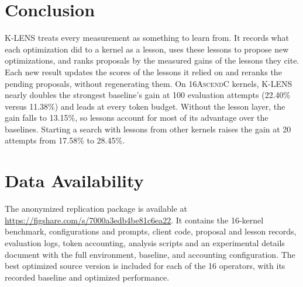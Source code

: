 \documentclass[acmsmall,screen,review,anonymous,nonacm]{acmart}
\newcommand{\klens}{\textsc{K-LENS}\xspace}
\newcommand{\ascendc}{\textsc{AscendC}\xspace}
\newcommand{\numkernels}{16\xspace}
\newcommand{\numprofiles}{100\xspace}
\begin{document}
\section{Conclusion}

\klens treats every measurement as something to learn from. It records what each
optimization did to a kernel as a lesson, uses these lessons to propose new
optimizations, and ranks proposals by the measured gains of the lessons they cite.
Each new result updates the scores of the lessons it relied on and reranks the
pending proposals, without regenerating them. On \numkernels \ascendc kernels,
\klens nearly doubles the strongest baseline's gain at \numprofiles evaluation
attempts (22.40\% versus 11.38\%) and leads at every token budget. Without the
lesson layer, the gain falls to 13.15\%, so lessons account for most of its
advantage over the baselines. Starting a search with lessons from other kernels
raises the gain at 20 attempts from 17.58\% to 28.45\%.

\section*{Data Availability}

The anonymized replication package is available at \url{https://figshare.com/s/7000a3edb4be81c6ea22}. It contains the 16-kernel benchmark, configurations and prompts, client code, proposal and lesson records, evaluation logs,
token accounting, analysis scripts and an experimental details document with the full environment, baseline, and accounting
configuration. The best optimized source version is included for each of the 16 operators,
with its recorded baseline and optimized performance.



\end{document}
